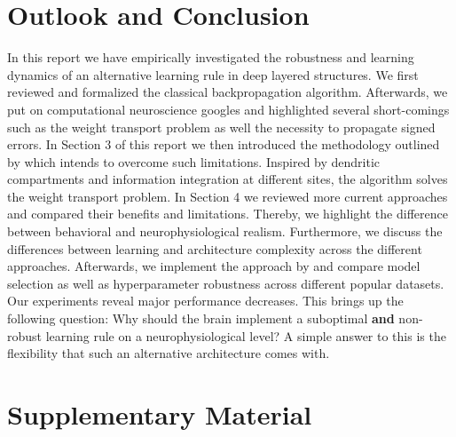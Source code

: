 \documentclass{article}
\theoremstyle{definition}
\begin{document}
\newpage
\section{Outlook and Conclusion}

In this report we have empirically investigated the robustness and learning dynamics of an alternative learning rule in deep layered structures.
We first reviewed and formalized the classical backpropagation algorithm. Afterwards, we put on computational neuroscience googles and highlighted several short-comings such as the weight transport problem as well the necessity to propagate signed errors.
In Section 3 of this report we then introduced the methodology outlined by \citet{guerguiev2017} which intends to overcome such limitations. Inspired by dendritic compartments and information integration at different sites, the algorithm solves the weight transport problem.
In Section 4 we reviewed more current approaches and compared their benefits and limitations. Thereby, we highlight the difference between behavioral and neurophysiological realism. Furthermore, we discuss the differences between learning and architecture complexity across the different approaches.
Afterwards, we implement the approach by \citet{guerguiev2017} and compare model selection as well as hyperparameter robustness across different popular datasets. Our experiments reveal major performance decreases. This brings up the following question: Why should the brain implement a suboptimal \textbf{and} non-robust learning rule on a neurophysiological level? A simple answer to this is the flexibility that such an alternative architecture comes with.



\setlength{\bibsep}{4pt plus 0.3ex}

{\footnotesize }

\newpage
\section*{Supplementary Material}


\end{document}
